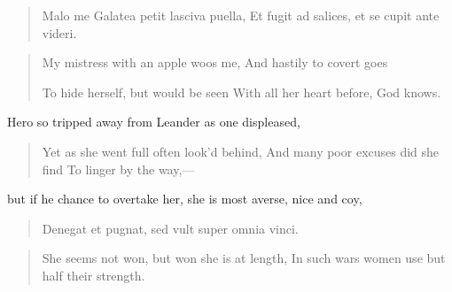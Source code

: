 \begin{latin}
\begin{verse}
Malo me Galatea petit lasciva puella,
Et fugit ad salices, et se cupit ante videri.
\end{verse}
\end{latin}
\translationrule%
\begin{verse}%
My mistress with an apple woos me,
And hastily to covert goes

To hide herself, but would be seen
With all her heart before, God knows.
\end{verse}%

Hero so tripped away from Leander as one displeased,

\begin{verse}%
Yet as she went full often look'd behind,
And many poor excuses did she find
To linger by the way,---
\end{verse}%

but if he chance to overtake her, she is most averse, nice and coy,

\begin{latin}
\begin{verse}
Denegat et pugnat, sed vult super omnia vinci.
\end{verse}
\end{latin}
\translationrule%
\begin{verse}%
She seems not won, but won she is at length,
In such wars women use but half their strength.
\end{verse}%

